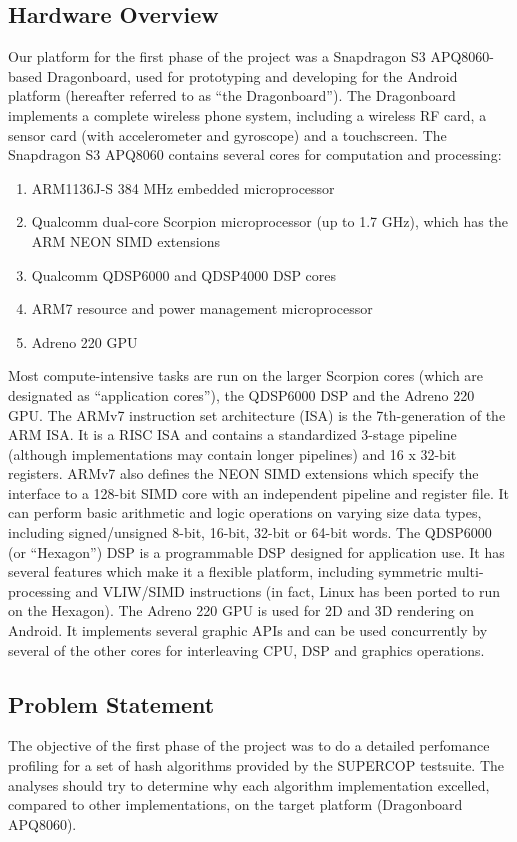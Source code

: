 \documentclass[10pt,a4paper]{article}
\begin{document}
\subsection{Hardware Overview}
Our platform for the first phase of the project was a Snapdragon S3 APQ8060-based Dragonboard, used for prototyping and developing for the Android platform (hereafter referred to as ``the Dragonboard'').  The Dragonboard implements a complete wireless phone system, including a wireless RF card, a sensor card (with accelerometer and gyroscope) and a touchscreen.  The Snapdragon S3 APQ8060 contains several cores for computation and processing:

\begin{enumerate}
	\item ARM1136J-S 384 MHz embedded microprocessor
	\item Qualcomm dual-core Scorpion microprocessor (up to 1.7 GHz), which has the ARM NEON SIMD extensions
	\item Qualcomm QDSP6000 and QDSP4000 DSP cores
	\item ARM7 resource and power management microprocessor
	\item Adreno 220 GPU
\end{enumerate}

Most compute-intensive tasks are run on the larger Scorpion cores (which are designated as ``application cores''), the QDSP6000 DSP and the Adreno 220 GPU.  The ARMv7 instruction set architecture (ISA) is the 7th-generation of the ARM ISA.  It is a RISC ISA and contains a standardized 3-stage pipeline (although implementations may contain longer pipelines) and 16 x 32-bit registers.  ARMv7 also defines the NEON SIMD extensions which specify the interface to a 128-bit SIMD core with an independent pipeline and register file.  It can perform basic arithmetic and logic operations on varying size data types, including signed/unsigned 8-bit, 16-bit, 32-bit or 64-bit words.  The QDSP6000 (or ``Hexagon'') DSP is a programmable DSP designed for application use.  It has several features which make it a flexible platform, including symmetric multi-processing and VLIW/SIMD instructions (in fact, Linux has been ported to run on the Hexagon).  The Adreno 220 GPU is used for 2D and 3D rendering on Android.  It implements several graphic APIs and can be used concurrently by several of the other cores for interleaving CPU, DSP and graphics operations.

\subsection{Problem Statement}
The objective of the first phase of the project was to do a detailed perfomance profiling for a set of hash algorithms provided by the SUPERCOP testsuite. The analyses should try to determine why each algorithm implementation excelled, compared to other implementations,  on the target platform (Dragonboard APQ8060).   
\end{document}
